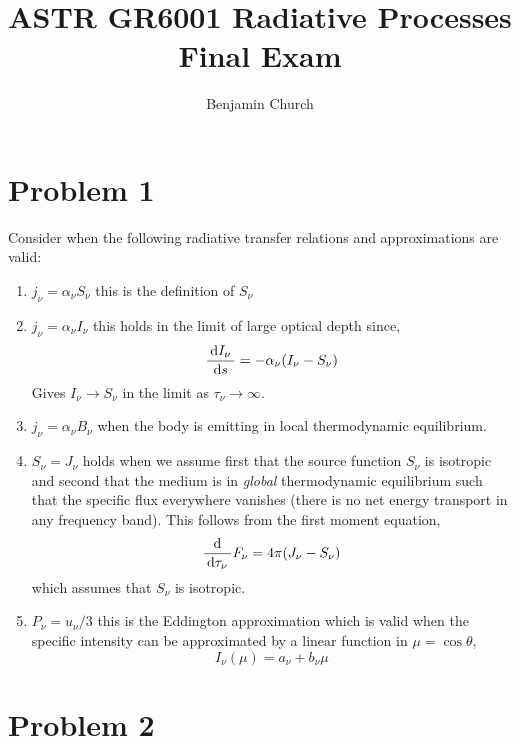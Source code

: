 \documentclass[12pt]{article}
\begin{document}
\title{
	\large \textbf{ASTR GR6001 Radiative Processes
	\\ Final Exam}}
\author{Benjamin Church }

\maketitle

\newcommand{\DM}{\mathrm{DM}}
\newcommand{\RM}{\mathrm{RM}}
\newcommand{\cm}{\mathrm{cm}}
\newcommand{\pc}{\mathrm{pc}}

\section{Problem 1}

Consider when the following radiative transfer relations and approximations are valid:

\begin{enumerate}
\item $j_\nu = \alpha_\nu S_\nu$ this is the definition of $S_\nu$
\item $j_\nu = \alpha_\nu I_\nu$ this holds in the limit of large optical depth since,
\[ \frac{\: \mathrm{d}I_\nu \:}{\: \mathrm{d}s \:} = - \alpha_\nu (I_\nu - S_\nu) \]
Gives $I_\nu \to S_\nu$ in the limit as $\tau_\nu \to \infty$. 
\item $j_\nu = \alpha_\nu B_\nu$ when the body is emitting in local thermodynamic equilibrium.
\item $S_\nu = J_\nu$ holds when we assume first that the source function $S_\nu$ is isotropic and second that the medium is in \textit{global} thermodynamic equilibrium such that the specific flux everywhere vanishes (there is no net energy transport in any frequency band). This follows from the first moment equation,
\[ \frac{\: \mathrm{d} \:}{\: \mathrm{d}\tau_\nu \:} F_\nu = 4 \pi (J_\nu - S_\nu) \]
which assumes that $S_\nu$ is isotropic. 
\item $P_\nu = u_\nu  / 3$ this is the Eddington approximation which is valid when the specific intensity can be approximated by a linear function in $\mu = \cos{\theta}$,
\[ I_\nu(\mu) = a_\nu + b_\nu \mu \]

\end{enumerate}

\section{Problem 2}
\end{document}
